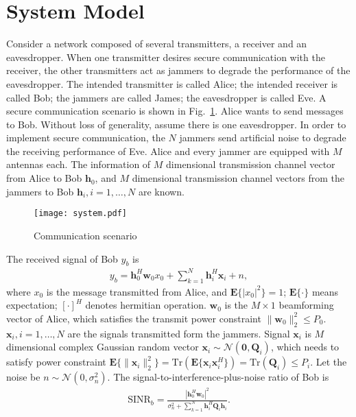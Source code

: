 \documentclass[conference]{IEEEtran}
\begin{document}
\section{System Model} \label{sec:system model}
Consider a network composed of several transmitters, a receiver and an eavesdropper. When one transmitter desires secure communication with the receiver, the other transmitters act as jammers to degrade the performance of the eavesdropper. The intended transmitter is called Alice; the intended receiver is called Bob; the jammers are called James; the eavesdropper is called Eve. A secure communication scenario is shown in Fig.~\ref{fig:system}. Alice wants to send messages to Bob. Without loss of generality, assume there is one eavesdropper. In order to implement secure communication, the $N$ jammers send artificial noise to degrade the receiving performance of Eve.  Alice and every jammer are equipped with $M$ antennas each. The information of $M$ dimensional transmission channel vector from Alice to Bob $\mathbf{h}_0$, and $M$ dimensional transmission channel vectors from the jammers to Bob $\mathbf{h}_i, i = 1,\ldots,N$ are known.
\begin{figure}[!htbp]
	\centering
	\texttt{[image: system.pdf]} %
	\caption{Communication scenario}
	\label{fig:system}
\end{figure}
The received signal of Bob $y_b$ is
\begin{eqnarray}
y_b =\mathbf{h}_0^{H}\mathbf{w}_0x_0 + \sum_{k=1}^N \mathbf{h}_{i}^H\mathbf{x}_{i} + n,
\end{eqnarray}
where $x_0$ is the message transmitted from Alice, and $\mathbf{E}\{|x_0|^2\} = 1$; $\mathbf{E}\{\cdot\}$ means expectation; $[\cdot]^H$ denotes hermitian operation. $\mathbf{w}_{0}$  is the $M \times 1$ beamforming vector of Alice, which satisfies the transmit power constraint $\|\mathbf{w}_0\|_2^2 \leq P_0$. $\mathbf{x}_i, i = 1,\ldots,N $ are the signals transmitted form the jammers. Signal $\mathbf{x}_i$ is $M$ dimensional  complex Gaussian random vector $\mathbf{x}_i \sim \mathcal{N}(\mathbf{0}, \mathbf{Q}_i)$, which needs to satisfy power constraint $\mathbf{E}\{\|\mathbf{x}_i\|_2^2\}  = \mathrm{Tr}(\mathbf{E}\{\mathbf{x}_i\mathbf{x}_i^H\} )= \mathrm{Tr}(\mathbf{Q}_i) \leq P_i$. Let the noise be $n \sim \mathcal{N}(0,\sigma_n^2)$. The signal-to-interference-plus-noise ratio of Bob is
\begin{eqnarray}
\mathrm{SINR}_b = \frac{\left| \mathbf{h}_{0}^H\mathbf{w}_{0}\right|^2}{\sigma_n^2 + \sum_{k=1}^{N}\mathbf{h}_{i}^H\mathbf{Q}_{i}\mathbf{h}_i}.
\end{eqnarray}
\end{document}
